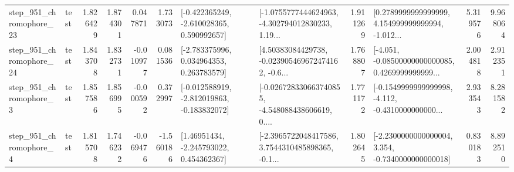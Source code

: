 \begin{tabular}{llrrrrllrlrr}
  step\_951\_chromophore\_23 &      test &      1.826429 &    1.874301 &      0.047871 &  1.733073 &   [-0.422365249, -2.610028365, 0.590992657] &  [-1.0755777444624963, -4.302794012830233, 1.19... &       1.911269 &  [0.2789999999999999, 4.154999999999994, -1.012... &            5.319576 &          9.968064 \\
  step\_951\_chromophore\_24 &      test &      1.843708 &    1.832731 &     -0.010977 &  0.081536 &    [-2.783375996, 0.034964353, 0.263783579] &  [4.50383084429738, -0.023905469672474162, -0.6... &       1.768807 &  [-4.051, -0.08500000000000085, 0.4269999999999... &            2.004818 &          2.912351 \\
   step\_951\_chromophore\_3 &      test &      1.857586 &    1.856995 &     -0.000592 &  0.372997 &  [-0.012588919, -2.812019863, -0.183832072] &  [-0.026728330663740855, -4.548088438606619, 0.... &       1.771172 &  [-0.1549999999999998, -4.112, -0.4310000000000... &            2.933543 &          8.281582 \\
   step\_951\_chromophore\_4 &      test &      1.815708 &    1.746232 &     -0.069476 & -1.560186 &     [1.46951434, -2.245793022, 0.454362367] &  [-2.3965722048417586, 3.7544310485898365, -0.1... &       1.802645 &  [-2.2300000000000004, 3.354, -0.7340000000000018] &            0.830183 &          8.892510 \\
\bottomrule
\end{tabular}

